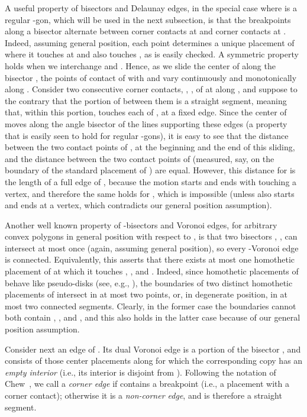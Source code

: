 \documentclass[letter,11pt]{article}
\begin{document}
A useful property of bisectors and Delaunay edges, in the special case where  is a regular 
-gon, which will be used in the next subsection, is that the breakpoints along a bisector 
 alternate between corner contacts at  and corner contacts at . 
Indeed, assuming general position, each point  determines a unique
placement of  where it touches  at  and also touches , as
is easily checked. A symmetric property holds when we interchange 
and . Hence, as we slide the center of  along the bisector
, the points of contact of  with  and  vary
continuously and monotonically along . Consider two consecutive
corner contacts, , , of  at  along , and
suppose to the contrary that the portion of  between
them is a straight segment, meaning that, within this portion, 
 touches each of ,  at a fixed edge. Since the center of
 moves along the angle bisector of the lines supporting these
edges (a property that is easily seen to hold for regular -gons), it is easy to see that the distance between the two contact
points of , at the beginning and the end of this sliding, and
the distance between the two contact points of  (measured, say, 
on the boundary of the standard placement of ) are equal. However,
this distance for  is the length of a full edge of , because
the motion starts and ends with  touching a vertex, and therefore
the same holds for , which is impossible (unless  also starts
and ends at a vertex, which contradicts our general position
assumption).

Another well known property of -bisectors and Voronoi edges, for arbitrary convex polygons in general position with respect to , is that
two bisectors , , can intersect at
most once (again, assuming general position), so every -Voronoi edge  is connected. Equivalently, this
asserts that there exists at most one homothetic placement of  at
which it touches , , and . Indeed, since homothetic
placements of  behave like pseudo-disks (see, e.g., \cite{KLPS}),
the boundaries of two distinct homothetic placements of  intersect
in at most two points, or, in degenerate position, in at most two
connected segments. Clearly, in the former case the boundaries 
cannot both contain , , and , and this also holds in the
latter case because of our general position assumption.


Consider next an edge  of . Its dual Voronoi edge
 is a portion of the bisector , and consists of those
center placements along  for which the corresponding copy 
has an {\em empty interior} (i.e., its interior is disjoint from ).
Following the notation of Chew~\cite{Chew}, we call  a
{\em corner edge} if  contains a breakpoint
(i.e., a placement with a corner contact); otherwise it is a
{\em non-corner edge}, and is therefore a straight segment.
\end{document}
